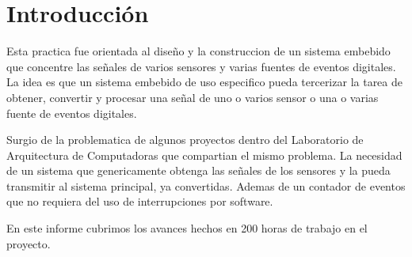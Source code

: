 \section{Introducción} %
\label{sec:introduccion}

Esta practica fue orientada al diseño y la construccion de un sistema embebido que concentre las señales de varios sensores y varias fuentes de eventos digitales. La idea es que un sistema embebido de uso especifico pueda tercerizar la tarea de obtener, convertir y procesar una señal de uno o varios sensor o una o varias fuente de eventos digitales.

Surgio de la problematica de algunos proyectos dentro del Laboratorio de Arquitectura de Computadoras que compartian el mismo problema. La necesidad de un sistema que genericamente obtenga las señales de los sensores y la pueda transmitir al sistema principal, ya convertidas. Ademas de un contador de eventos que no requiera del uso de interrupciones por software.

En este informe cubrimos los avances hechos en 200 horas de trabajo en el proyecto.
